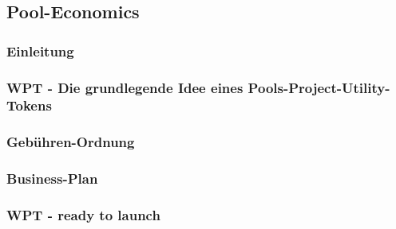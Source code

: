 \subsection{Pool-Economics}
\vspace{0.3cm}


\subsubsection{Einleitung}
\vspace{0.2cm}
\vspace{0.5cm}

\subsubsection{WPT - Die grundlegende Idee eines Pools-Project-Utility-Tokens}
\label{sec:wpt-design}
\vspace{0.2cm}

\vspace{0.5cm}

\subsubsection{Gebühren-Ordnung}
\label{sec:fees}
\vspace{0.2cm}
\vspace{0.5cm}

\subsubsection{Business-Plan}
\label{sec:bp}
\vspace{0.2cm}
\vspace{0.5cm}

\subsubsection{WPT - ready to launch}
\label{sec:wpt}
\vspace{0.2cm}
\vspace{0.5cm}




\newpage



